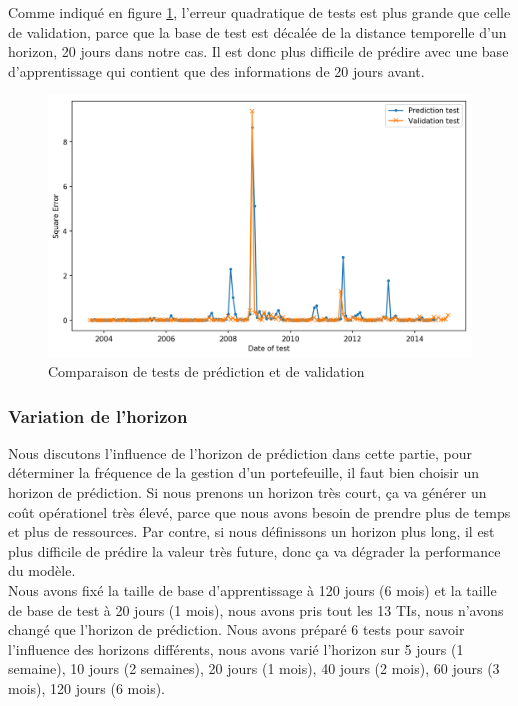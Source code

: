 Comme indiqué en figure \ref{fig:test}, l'erreur quadratique de tests est plus grande que celle de validation, parce que la base de test est décalée de la distance temporelle d'un horizon, 20 jours dans notre cas. Il est donc plus difficile de prédire avec une base d'apprentissage qui contient que des informations de 20 jours avant.


\begin{figure}[H]
\centering
\includegraphics[width=.9\linewidth, scale=0.2]
{plot/VP.png}
\caption{Comparaison de tests de prédiction et de validation}
\label{fig:test}
\end{figure}

\subsubsection{Variation de l'horizon}

Nous discutons l'influence de l'horizon de prédiction dans cette partie, pour déterminer la fréquence de la gestion d'un portefeuille, il faut bien choisir un horizon de prédiction. Si nous prenons un horizon très court, ça va générer un coût opérationel très élevé, parce que nous avons besoin de prendre plus de temps et plus de ressources. Par contre, si nous définissons un horizon plus long, il est plus difficile de prédire la valeur très future, donc ça va dégrader la performance du modèle. \\

Nous avons fixé la taille de base d'apprentissage à 120 jours (6 mois) et la taille de base de test à 20 jours (1 mois), nous avons pris tout les 13 TIs, nous n'avons changé que l'horizon de prédiction. Nous avons préparé 6 tests pour savoir l'influence des horizons différents, nous avons varié l'horizon sur 5 jours (1 semaine), 10 jours (2 semaines), 20 jours (1 mois), 40 jours (2 mois), 60 jours (3 mois), 120 jours (6 mois). \\

